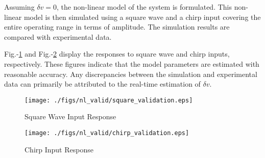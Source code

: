 Assuming $\delta v = 0$, the non-linear model of the system is formulated. This non-linear model is then simulated using a square wave and a chirp input covering the entire operating range in terms of amplitude. The simulation results are compared with experimental data.

Fig.-\ref{fig::sq_valid} and Fig.-\ref{fig::chirp_valid} display the responses
to square wave and chirp inputs, respectively. These figures indicate that the
model parameters are estimated with reasonable accuracy. Any discrepancies
between the simulation and experimental data can primarily be attributed to the
real-time estimation of $\delta v$.
\begin{figure}[h]
    \centering
    \texttt{[image: ./figs/nl\_valid/square\_validation.eps]}
    \caption{Square Wave Input Response}
    \label{fig::sq_valid}
\end{figure}
\begin{figure}[h]
    \centering
    \texttt{[image: ./figs/nl\_valid/chirp\_validation.eps]}
    \caption{Chirp Input Response}
    \label{fig::chirp_valid}
\end{figure}
